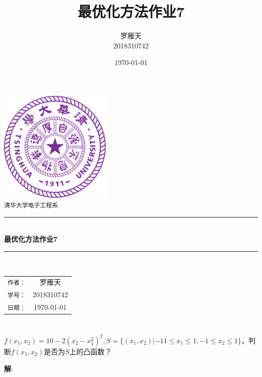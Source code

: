 \documentclass[a4paper]{article}
\title{最优化方法作业7}
\author{罗雁天 \\
2018310742}
\date{\today}
\begin{document}
\newcommand{\HRule}{\rule{\linewidth}{0.5mm}}
\begin{titlepage}
	\begin{center}
		\includegraphics[width=0.4\textwidth]{Tsinghua2.png}\\[1cm]
		\textsc{\Large \texttt{清华大学电子工程系}}\\[1cm]
		\HRule \\[1cm]
		{\Huge \bfseries 最优化方法作业7}\\[0.4cm]
		\HRule \\[3.5cm]
		\begin{minipage}{0.4\textwidth}
			\begin{center}
				\Large
				\begin{tabular}{cc}
					\texttt{作者：} & 罗雁天 \\[0.5cm]
					\texttt{学号：} & 2018310742 \\[0.5cm]
					\texttt{日期：} & \today
				\end{tabular}
			\end{center}
		\end{minipage}
		\vfill
	\end{center}
\end{titlepage}

\section{}
$f(x_1,x_2)=10-2(x_2-x_1^2)^2,S=\{(x_1,x_2)|-11\le x_1 \le 1, -1\le x_2\le 1\}$，判断$f(x_1,x_2)$是否为$S$上的凸函数？

\textbf{解}:
\end{document}
